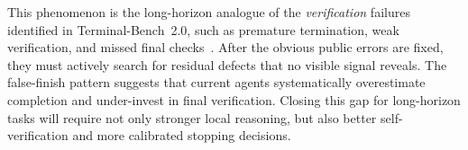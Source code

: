This phenomenon is the long-horizon analogue of the \emph{verification} failures identified in Terminal-Bench~2.0, such as premature termination, weak verification, and missed final checks~\citep{merrill2026terminalbenchbenchmarkingagentshard}.
After the obvious public errors are fixed, they must actively search for residual defects that no visible signal reveals.
%
The false-finish pattern suggests that current agents systematically overestimate completion and under-invest in final verification.
%
Closing this gap for long-horizon tasks will require not only stronger local reasoning, but also better self-verification and more calibrated stopping decisions.